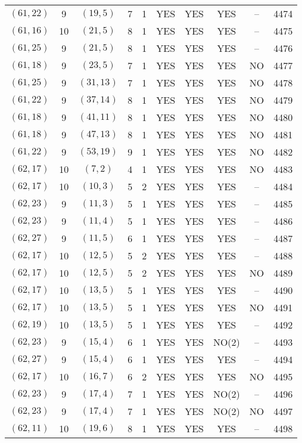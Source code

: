 \begin{longtable}{|c|c|c|c|c|c|c|c|c|c|}
$(61, 22)$ & 9 & $(19, 5)$ & 7 & 1 & YES & YES & YES & -- & 4474\\
$(61, 16)$ & 10 & $(21, 5)$ & 8 & 1 & YES & YES & YES & -- & 4475\\
$(61, 25)$ & 9 & $(21, 5)$ & 8 & 1 & YES & YES & YES & -- & 4476\\
$(61, 18)$ & 9 & $(23, 5)$ & 7 & 1 & YES & YES & YES & NO & 4477\\
$(61, 25)$ & 9 & $(31, 13)$ & 7 & 1 & YES & YES & YES & NO & 4478\\
$(61, 22)$ & 9 & $(37, 14)$ & 8 & 1 & YES & YES & YES & NO & 4479\\
$(61, 18)$ & 9 & $(41, 11)$ & 8 & 1 & YES & YES & YES & NO & 4480\\
$(61, 18)$ & 9 & $(47, 13)$ & 8 & 1 & YES & YES & YES & NO & 4481\\
$(61, 22)$ & 9 & $(53, 19)$ & 9 & 1 & YES & YES & YES & NO & 4482\\
$(62, 17)$ & 10 & $(7, 2)$ & 4 & 1 & YES & YES & YES & NO & 4483\\
$(62, 17)$ & 10 & $(10, 3)$ & 5 & 2 & YES & YES & YES & -- & 4484\\
$(62, 23)$ & 9 & $(11, 3)$ & 5 & 1 & YES & YES & YES & -- & 4485\\
$(62, 23)$ & 9 & $(11, 4)$ & 5 & 1 & YES & YES & YES & -- & 4486\\
$(62, 27)$ & 9 & $(11, 5)$ & 6 & 1 & YES & YES & YES & -- & 4487\\
$(62, 17)$ & 10 & $(12, 5)$ & 5 & 2 & YES & YES & YES & -- & 4488\\
$(62, 17)$ & 10 & $(12, 5)$ & 5 & 2 & YES & YES & YES & NO & 4489\\
$(62, 17)$ & 10 & $(13, 5)$ & 5 & 1 & YES & YES & YES & -- & 4490\\
$(62, 17)$ & 10 & $(13, 5)$ & 5 & 1 & YES & YES & YES & NO & 4491\\
$(62, 19)$ & 10 & $(13, 5)$ & 5 & 1 & YES & YES & YES & -- & 4492\\
$(62, 23)$ & 9 & $(15, 4)$ & 6 & 1 & YES & YES & NO(2) & -- & 4493\\
$(62, 27)$ & 9 & $(15, 4)$ & 6 & 1 & YES & YES & YES & -- & 4494\\
$(62, 17)$ & 10 & $(16, 7)$ & 6 & 2 & YES & YES & YES & NO & 4495\\
$(62, 23)$ & 9 & $(17, 4)$ & 7 & 1 & YES & YES & NO(2) & -- & 4496\\
$(62, 23)$ & 9 & $(17, 4)$ & 7 & 1 & YES & YES & NO(2) & NO & 4497\\
$(62, 11)$ & 10 & $(19, 6)$ & 8 & 1 & YES & YES & YES & -- & 4498\\

\end{longtable}
